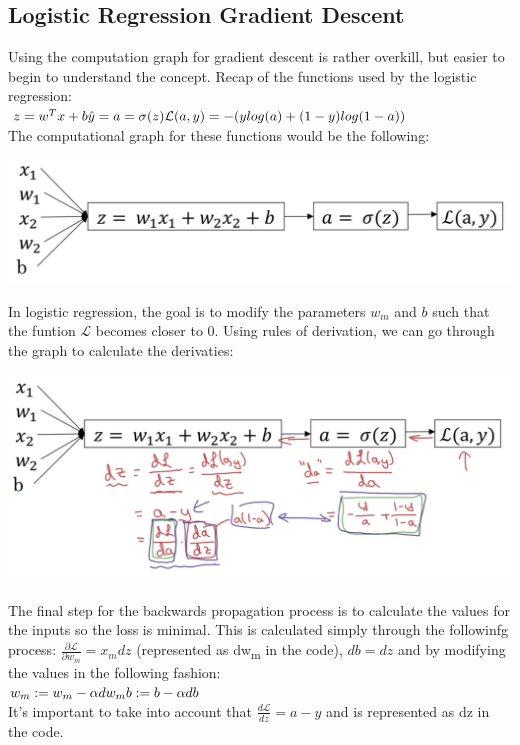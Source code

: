 \documentclass[11pt]{report}
\begin{document}
\subsection{Logistic Regression Gradient Descent}
Using the computation graph for gradient descent is rather overkill, but easier to begin to understand the concept. 
Recap of the functions used by the logistic regression:\\
$z = w^T    x + b\\ \hat{y} = a = \sigma(z) \\  \mathcal{L}(a,y)= -(ylog(a)+(1-y)log(1-a))$\\
The computational graph for these functions would be the following:
\begin{center}
    \includegraphics[width = .75\textwidth]{CGE.png}
\end{center}
In logistic regression, the goal is to modify the parameters $w_m$ and $b$ such that the funtion $\mathcal{L}$ becomes closer to 0. Using rules of derivation, we can go through the graph to calculate the derivaties:
\begin{center}
    \includegraphics[width = .75\textwidth]{DCGE.png}
\end{center}
The final step for the backwards propagation process is to calculate the values for the inputs so the loss is minimal. This is calculated simply through the followinfg process: $\frac{\partial \mathcal{L}}{\partial w_{m}} = x_{m}dz $ (represented as dw\textsubscript{m} in the code), $db = dz$ and by modifying the values in the following fashion:\\
$w_m:=w_m - \alpha dw_m \\ b:= b-\alpha db$\\
It's important  to take into account that $\frac{d\mathcal{L}}{dz}=a-y$ and is represented as dz in the code.
\end{document}
